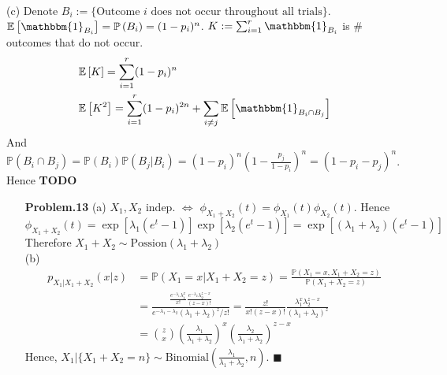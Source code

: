 \documentclass[a4paper, 11pt]{article}
\begin{document}
\begin{itemize}
\begin{equation}
\begin{split}
		\end{split}
	\end{equation}
	(c) Denote $B_i:=\{\text{Outcome $i$ does not occur throughout all trials}\}$. $\mathbb{E}\left[\mathbbm{1}_{B_i}\right]=\mathbb{P}\left(B_i\right)=(1-p_i)^n$. $K:=\sum_{i=1}^r \mathbbm{1}_{B_i}$ is $\#$outcomes that do not occur.
	\begin{equation}
		\begin{split}
			&\mathbb{E}\left[K\right]=\sum_{i=1}^r(1-p_i)^n\\
			&\mathbb{E}\left[K^2\right]=\sum_{i=1}^r(1-p_i)^{2n}+\sum_{i\ne j} \mathbb{E}\left[\mathbbm{1}_{B_i\cap B_j}\right]
		\end{split}
	\end{equation}
	And $\mathbb{P}\left(B_i\cap B_j\right)=\mathbb{P}\left(B_i\right)\mathbb{P}\left(B_j|B_i\right)=(1-p_i)^n\left(1-\frac{p_j}{1-p_i}\right)^n=(1-p_i-p_j)^n$. Hence \textbf{TODO}
\end{itemize}

\begin{itemize}
	\item[\textbf{Problem.13}] (a) $X_1, X_2$ indep. $\iff$ $\phi_{X_1+X_2}(t)=\phi_{X_1}(t)\phi_{X_2}(t)$. Hence
	\begin{equation}
		\phi_{X_1+X_2}(t) = \exp[\lambda_1(e^t-1)]\exp[\lambda_2(e^t-1)] = \exp[(\lambda_1+\lambda_2)(e^t-1)]
	\end{equation}
	Therefore $X_1+X_2 \sim \text{Possion}(\lambda_1+\lambda_2)$\\
	(b) 
	\begin{equation}
		\begin{split}
			p_{X_1|X_1+X_2}(x|z)&=\mathbb{P}\left(X_1=x|X_1+X_2=z\right)=\frac{\mathbb{P}\left(X_1=x, X_1+X_2=z\right)}{\mathbb{P}\left(X_1+X_2=z\right)}\\
			&=\frac{\frac{e^{-\lambda_1}\lambda_1^{x}}{x!}\frac{e^{-\lambda_2}\lambda_2^{z-x}}{(z-x)!}}{e^{-\lambda_1-\lambda_2}(\lambda_1+\lambda_2)^{z}/z!}=\frac{z!}{x!(z-x)!}\frac{\lambda_1^x\lambda_2^{z-x}}{(\lambda_1+\lambda_2)^z}\\
			&=\binom{z}{x} \left(\frac{\lambda_1}{\lambda_1+\lambda_2}\right)^x\left(\frac{\lambda_2}{\lambda_1+\lambda_2}\right)^{z-x}
		\end{split}
	\end{equation}
	Hence, $X_1|\{X_1+X_2=n\} \sim \text{Binomial}(\frac{\lambda_1}{\lambda_1+\lambda_2}, n)$. $\blacksquare$
\end{itemize}
\end{document}
